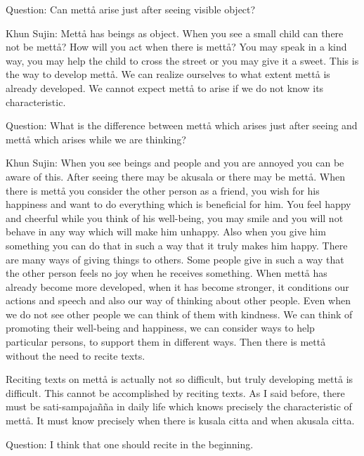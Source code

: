 \documentclass[12pt,twoside]{article}
\begin{document}
Question: Can mett{\aa} arise just after seeing visible object? 

Khun Sujin: Mett{\aa} has beings as object. When you see a small child
can there not be mett{\aa}? How will you act when there is mett{\aa}?
You may speak in a kind way, you may help the child to cross the street
or you may give it a sweet. This is the way to develop mett{\aa}. We
can realize ourselves to what extent mett{\aa} is already developed. We
cannot expect mett{\aa} to arise if we do not know its characteristic. 

Question: What is the difference between mett{\aa} which arises just
after seeing and mett{\aa} which arises while we are thinking? 

Khun Sujin: When you see beings and people and you are annoyed you can
be aware of this. After seeing there may be akusala or there may be
mett{\aa}. When there is mett{\aa} you consider the other person as a
friend, you wish for his happiness and want to do everything which is
beneficial for him. You feel happy and cheerful while you think of his
well{}-being, you may smile and you will not behave in any way which
will make him unhappy. Also when you give him something you can do that
in such a way that it truly makes him happy. There are many ways of
giving things to others. Some people give in such a way that the other
person feels no joy when he receives something. When mett{\aa} has
already become more developed, when it has become stronger, it
conditions our actions and speech and also our way of thinking about
other people. Even when we do not see other people we can think of them
with kindness. We can think of promoting their well{}-being and
happiness, we can consider ways to help particular persons, to support
them in different ways. Then there is mett{\aa} without the need to
recite texts. 

Reciting texts on mett{\aa} is actually not so difficult, but truly
developing mett{\aa} is difficult. This cannot be accomplished by
reciting texts. As I said before, there must be sati{}-sampaja\~n\~na
in daily life which knows precisely the characteristic of mett{\aa}. It
must know precisely when there is kusala citta and when akusala citta. 

Question: I think that one should recite in the beginning. 
\end{document}
